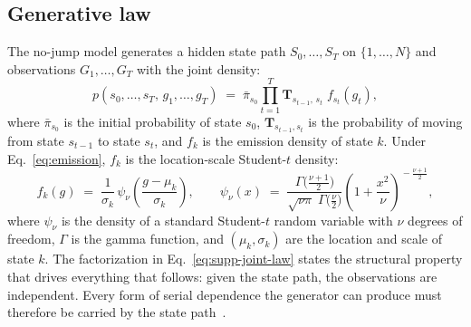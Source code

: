 \begin{table}[H]
\centering
\caption{\textbf{Closed-form quantities of the fitted SPY generator
    against sample and simulated values.} Each closed-form entry
    evaluates the expression named in the text at the fitted SPY
    model of Table~\ref{tab:hyperparams}. Sample values are computed
    from the in-sample SPY series; simulated values use $400$
    in-sample-length paths for the jump-episode quantities and
    $1{,}000$ paths for skewness. For comparison with the
    sup-distance entry, the two-sample Kolmogorov--Smirnov critical
    value at $\alpha = 0.05$ for two samples of $T = 2{,}766$
    observations is $1.358\sqrt{2/T} = 0.0365$. Observed
    autocorrelations are those of the in-sample series shown in
    Fig.~\ref{fig:empirical_motivation}d.}
\label{tab:supp-generator-quantities}
\footnotesize
\resizebox{\textwidth}{!}{}
\end{table}

\subsection{Generative law}
\label{sec:supp-gen-law}

The no-jump model generates a hidden state path $S_0, \dots, S_T$ on
$\{1, \dots, N\}$ and observations $G_1, \dots, G_T$ with the joint
density:
\begin{equation}
  p(s_0, \dots, s_T,\, g_1, \dots, g_T)
  \;=\; \bar\pi_{s_0} \prod_{t=1}^{T}
  \mathbf{T}_{s_{t-1},\, s_t}\; f_{s_t}(g_t),
  \label{eq:supp-joint-law}
\end{equation}
where $\bar\pi_{s_0}$ is the initial probability of state $s_0$,
$\mathbf{T}_{s_{t-1}, s_t}$ is the probability of moving from state
$s_{t-1}$ to state $s_t$, and $f_k$ is the emission density of state
$k$. Under Eq.~\eqref{eq:emission}, $f_k$ is the location-scale
Student-$t$ density:
\begin{equation}
  f_k(g) \;=\; \frac{1}{\sigma_k}\,
  \psi_\nu\!\left(\frac{g - \mu_k}{\sigma_k}\right),
  \qquad
  \psi_\nu(x) \;=\;
  \frac{\Gamma\!\big(\tfrac{\nu+1}{2}\big)}
       {\sqrt{\nu \pi}\; \Gamma\!\big(\tfrac{\nu}{2}\big)}
  \left(1 + \frac{x^2}{\nu}\right)^{\!-\frac{\nu+1}{2}},
  \label{eq:supp-emission-density}
\end{equation}
where $\psi_\nu$ is the density of a standard Student-$t$ random
variable with $\nu$ degrees of freedom, $\Gamma$ is the gamma
function, and $(\mu_k, \sigma_k)$ are the location and scale of state
$k$. The factorization in Eq.~\eqref{eq:supp-joint-law} states the
structural property that drives everything that follows: given the
state path, the observations are independent. Every form of serial
dependence the generator can produce must therefore be carried by the
state path~\cite{rabinerJuang1986}.

